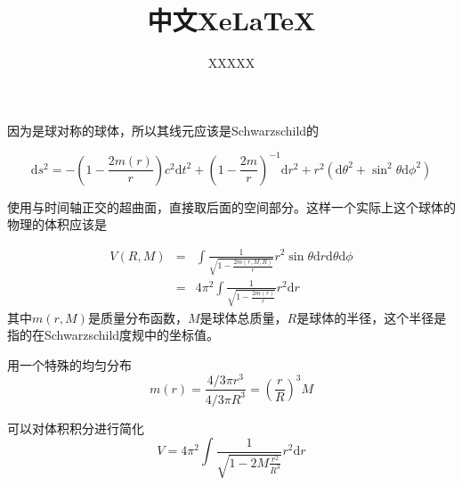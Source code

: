 \documentclass[12pt,a4paper]{article}
\begin{document}
\title{\Huge 中文XeLaTeX}


\author{XXXXX}


\newcommand{\dd}{\mathrm d}
\newenvironment{eqnset}
{\begin{equation}\left \bracevert \begin{array}{l}}
{\end{array} \right. \end{equation}}

\newenvironment{eqn}
{\begin{equation}\left \bracevert \begin{array}{l}}
{\end{array} \right. \end{equation}}





因为是球对称的球体，所以其线元应该是Schwarzschild的

\begin{equation}
\mathrm ds^2 = -(1-\frac{2m(r)}{r})c^2 \mathrm dt^2 + (1- \frac{2m}{r})^{-1}\mathrm d r^2 +r^2 (\mathrm d\theta^2 + \sin^2\theta \mathrm d\phi^2)
\end{equation}

使用与时间轴正交的超曲面，直接取后面的空间部分。这样一个实际上这个球体的物理的体积应该是

\begin{eqnarray}
V(R,M)&=&\int \frac{1}{\sqrt{1-\frac{2m(r,M,R)}{r}}} r^2 \sin\theta \mathrm dr\mathrm d\theta\mathrm d\phi \\
&=&4\pi^2 \int \frac{1}{\sqrt{1-\frac{2m(r)}{r}}}r^2 \mathrm dr
\end{eqnarray}
其中$m(r,M)$是质量分布函数，$M$是球体总质量，$R$是球体的半径，这个半径是指的在Schwarzschild度规中的坐标值。

用一个特殊的均匀分布
\begin{equation}
m(r)=\frac{4/3 \pi r^3}{4/3 \pi R^3}=(\frac{r}{R})^3 M
\end{equation}

可以对体积积分进行简化
\begin{equation}
V=4\pi^2 \int \frac{1}{\sqrt{1-2 M \frac{r^2}{R^3}}}r^2\mathrm dr
\end{equation}
\end{document}
